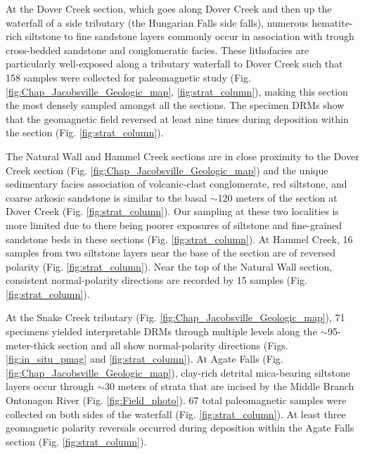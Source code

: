At the Dover Creek section, which goes along Dover Creek and then up the waterfall of a side tributary (the Hungarian Falls side falls), numerous hematite-rich siltstone to fine sandstone layers commonly occur in association with trough cross-bedded sandstone and conglomeratic facies. These lithofacies are particularly well-exposed along a tributary waterfall to Dover Creek such that 158 samples were collected for paleomagnetic study (Fig. \ref{fig:Chap_Jacobsville_Geologic_map}, \ref{fig:strat_column}), making this section the most densely sampled amongst all the sections. The specimen DRMs show that the geomagnetic field reversed at least nine times during deposition within the section (Fig. \ref{fig:strat_column}). 

The Natural Wall and Hammel Creek sections are in close proximity to the Dover Creek section (Fig. \ref{fig:Chap_Jacobsville_Geologic_map}) and the unique sedimentary facies association of volcanic-clast conglomerate, red siltstone, and coarse arkosic sandstone is similar to the basal $\sim$120 meters of the section at Dover Creek (Fig. \ref{fig:strat_column}). Our sampling at these two localities is more limited due to there being poorer exposures of siltstone and fine-grained sandstone beds in these sections (Fig. \ref{fig:strat_column}). At Hammel Creek, 16 samples from two siltstone layers near the base of the section are of reversed polarity (Fig. \ref{fig:strat_column}). Near the top of the Natural Wall section, consistent normal-polarity directions are recorded by 15 samples (Fig. \ref{fig:strat_column}). 

At the Snake Creek tributary (Fig. \ref{fig:Chap_Jacobsville_Geologic_map}), 71 specimens yielded interpretable DRMs through multiple levels along the $\sim$95-meter-thick section and all show normal-polarity directions (Figs. \ref{fig:in_situ_pmag} and \ref{fig:strat_column}). At Agate Falls (Fig. \ref{fig:Chap_Jacobsville_Geologic_map}), clay-rich detrital mica-bearing siltstone layers occur through $\sim$30 meters of strata that are incised by the Middle Branch Ontonagon River (Fig. \ref{fig:Field_photo}). 67 total paleomagnetic samples were collected on both sides of the waterfall (Fig. \ref{fig:strat_column}). At least three geomagnetic polarity reversals occurred during deposition within the Agate Falls section (Fig. \ref{fig:strat_column}). 

